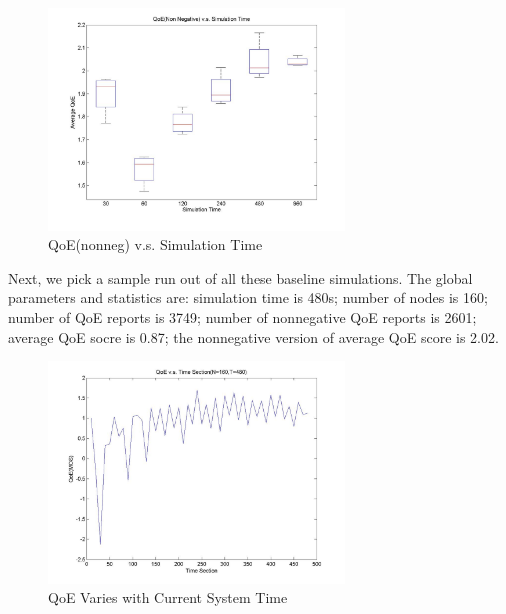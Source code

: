 \documentclass[11pt,a4paper]{article}
\begin{document}
\begin{figure}[htb]
\centering
	\includegraphics[width=0.7\textwidth]{../fig/simutime_qoe_nonneg.jpg}
	\caption{QoE(nonneg) v.s. Simulation Time}
	\label{fig:simu_base_qoenonneg_st}
\end{figure}



%

Next, we pick a sample run out of all these baseline simulations. 
The global parameters and statistics are: 
simulation time is 480s; number of nodes is 160;
number of QoE reports is 3749; number of nonnegative QoE reports is 2601;
average QoE socre is 0.87; the nonnegative version of average QoE score is 
2.02. 

\begin{figure}[htb]
\centering
	\includegraphics[width=0.7\textwidth]{../fig/time_qoe.jpg}
	\caption{QoE Varies with Current System Time}
	\label{fig:simu_base_qoe_vary}
\end{figure}
\end{document}
